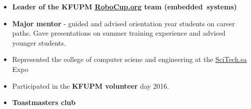 \divider

\begin{itemize}
      \item \textbf{Leader of the KFUPM \href{https://www.robocup.org/}{RoboCup.org} team (embedded~systems)}
      \item\textbf{Major mentor} - guided and advised orientation year students on career paths. Gave presentations on summer training experience and advised younger students.
      \item Represented the college of computer sciene and engineering at the \href{https://www.scitech.sa}{SciTech.sa} Expo
      \item Participated in the \textbf{KFUPM volunteer} day 2016.
      \item \textbf{Toastmasters club}%
\end{itemize}
